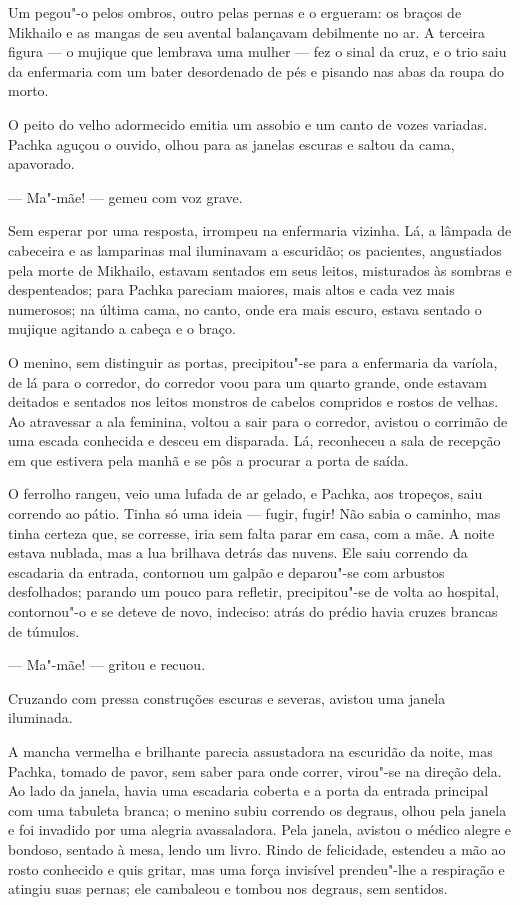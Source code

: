 Um pegou"-o pelos ombros, outro pelas pernas e o ergueram: os braços de
Mikhailo e as mangas de seu avental balançavam debilmente no ar. A
terceira figura --- o mujique que lembrava uma mulher --- fez o sinal da
cruz, e o trio saiu da enfermaria com um bater desordenado de pés e
pisando nas abas da roupa do morto.

O peito do velho adormecido emitia um assobio e um canto de vozes
variadas. Pachka aguçou o ouvido, olhou para as janelas escuras e saltou
da cama, apavorado.

--- Ma"-mãe! --- gemeu com voz grave.

Sem esperar por uma resposta, irrompeu na enfermaria vizinha. Lá, a
lâmpada de cabeceira e as lamparinas mal iluminavam a escuridão; os
pacientes, angustiados pela morte de Mikhailo, estavam sentados em seus
leitos, misturados às sombras e despenteados; para Pachka pareciam
maiores, mais altos e cada vez mais numerosos; na última cama, no canto,
onde era mais escuro, estava sentado o mujique agitando a cabeça e o
braço.

O menino, sem distinguir as portas, precipitou"-se para a enfermaria da
varíola, de lá para o corredor, do corredor voou para um quarto grande,
onde estavam deitados e sentados nos leitos monstros de cabelos
compridos e rostos de velhas. Ao atravessar a ala feminina, voltou a
sair para o corredor, avistou o corrimão de uma escada conhecida e
desceu em disparada. Lá, reconheceu a sala de recepção em que estivera
pela manhã e se pôs a procurar a porta de saída.

O ferrolho rangeu, veio uma lufada de ar gelado, e Pachka, aos tropeços,
saiu correndo ao pátio. Tinha só uma ideia --- fugir, fugir! Não sabia o
caminho, mas tinha certeza que, se corresse, iria sem falta parar em
casa, com a mãe. A noite estava nublada, mas a lua brilhava detrás das
nuvens. Ele saiu correndo da escadaria da entrada, contornou um galpão e
deparou"-se com arbustos desfolhados; parando um pouco para refletir,
precipitou"-se de volta ao hospital, contornou"-o e se deteve de novo,
indeciso: atrás do prédio havia cruzes brancas de túmulos.

--- Ma"-mãe! --- gritou e recuou.

Cruzando com pressa construções escuras e severas, avistou uma janela
iluminada.

A mancha vermelha e brilhante parecia assustadora na escuridão da noite,
mas Pachka, tomado de pavor, sem saber para onde correr, virou"-se na
direção dela. Ao lado da janela, havia uma escadaria coberta e a porta
da entrada principal com uma tabuleta branca; o menino subiu correndo os
degraus, olhou pela janela e foi invadido por uma alegria avassaladora.
Pela janela, avistou o médico alegre e bondoso, sentado à mesa, lendo um
livro. Rindo de felicidade, estendeu a mão ao rosto conhecido e quis
gritar, mas uma força invisível prendeu"-lhe a respiração e atingiu suas
pernas; ele cambaleou e tombou nos degraus, sem sentidos.

